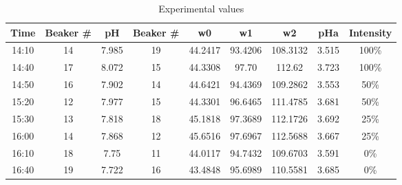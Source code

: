 \documentclass[a4paper]{report}
\begin{document}
\begin{table}[H]
\centering
\begin{tabular}{|c|c|c|c|c|c|c|c|c|}
\hline
Time  & Beaker \# & pH    & Beaker \# & w0      & w1      & w2       & pHa   & Intensity \\ \hline
14:10 & 14        & 7.985 & 19        & 44.2417 & 93.4206 & 108.3132 & 3.515 & 100\%     \\ \hline
14:40 & 17        & 8.072 & 15        & 44.3308 & 97.70   & 112.62   & 3.723 & 100\%     \\ \hline
14:50 & 16        & 7.902 & 14        & 44.6421 & 94.4369 & 109.2862 & 3.553 & 50\%      \\ \hline
15:20 & 12        & 7.977 & 15        & 44.3301 & 96.6465 & 111.4785 & 3.681 & 50\%      \\ \hline
15:30 & 13        & 7.818 & 18        & 45.1818 & 97.3689 & 112.1726 & 3.692 & 25\%      \\ \hline
16:00 & 14        & 7.868 & 12        & 45.6516 & 97.6967 & 112.5688 & 3.667 & 25\%      \\ \hline
16:10 & 18        & 7.75  & 11        & 44.0117 & 94.7432 & 109.6703 & 3.591 & 0\%       \\ \hline
16:40 & 19        & 7.722 & 16        & 43.4848 & 95.6989 & 110.5581 & 3.685 & 0\%       \\ \hline
\end{tabular}
\caption{Experimental values}
\label{tab:exp2_value}
\end{table}
\end{document}
